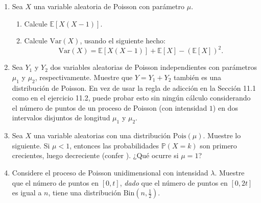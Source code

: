 \begin{enumerate}
	\centering
	\begin{tabular}{c|cccccccccc}
		$j$ 	& $0$ & $1$ & $2$ & $3$ & $4$ & $5$ & $6$ & $7$ & $8$ & $9$ \\
		\hline
		$f(x)$& $19$ & $38$ & $28$ & $20$ & $7$ & $3$ & $4$ & $0$ & $0$ & $1$
	\end{tabular}\quad.
	Note que el número total de autos que pasan en esos $20$ minutos es $230$.
	\begin{enumerate}
		\item ¿Qué elegirías para el parámetro de intensidad $\lambda$?\label{12.7a}
		\item Suponga que estima la probabilidad de que cero autos pasando en una ranura de tiempo de \SI{10}{\second} por $n_0$ dividido por el número total de ranuras de tiempo. ¿Eso está de acuerdo (razonablemente) con el valor que sigue desde su respuesta en?~\ref{12.7a}? %
		\item  ¿Qué tomarías para la probabilidad que $10$ autos pasan en una ranura de tiempo de \SI{10}{\second}?
	\end{enumerate}
	\item Sea $X$ una variable aleatoria de Poisson con parámetro $\mu$.
	\begin{enumerate}
		\item Calcule $\mathds{E}\left[X\left(X-1\right)\right]$.
		\item Calcule $\mathrm{Var}\left(X\right)$, usando el siguiente hecho:
		\begin{equation*}
		\mathrm{Var}\left(X\right)=\mathds{E}\left[X\left(X-1\right)\right]+\mathds{E}\left[X\right]-{\left(\mathds{E}\left[X\right]\right)}^2.
		\end{equation*}
	\end{enumerate}
	\item Sea $Y_1$ y $Y_2$ dos variables aleatorias de Poisson independientes con parámetros $\mu_1$ y $\mu_2$, respectivamente. Muestre que $Y=Y_1+Y_2$ también es una distribución de Poisson. En vez de usar la regla de adicción en la Sección 11.1 como en el ejercicio 11.2, puede probar esto sin ningún cálculo considerando el número de puntos de un proceso de Poisson (con intensidad $1$) en dos intervalos disjuntos de longitud $\mu_1$ y $\mu_2$.
	\item Sea $X$ una variable aleatorias con una distribución $\mathrm{Pois}\left(\mu\right)$. Muestre lo siguiente. Si $\mu<1$, entonces las probabilidades $\mathds{P}\left(X=k\right)$ son primero crecientes, luego decreciente (confer ). ¿Qué ocurre si $\mu=1$? %
	\item Considere el proceso de Poisson unidimensional con intensidad $\lambda$. Muestre que el número de puntos en $\left[0,t\right]$, \emph{dado} que el número de puntos en $\left[0,2t\right]$ es igual a $n$, tiene una distribución $\mathrm{Bin}\left(n,\tfrac{1}{2}\right)$.


\end{enumerate}
